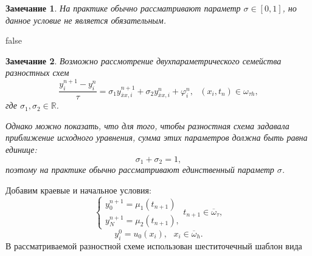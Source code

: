 \documentclass[11pt,a4paper,twoside,listtotoc,bibtotoc]{report}
\numberwithin{equation}{section}
\theoremstyle{definition}
\theoremstyle{plain}
\newtheorem{note}{Замечание}[section]
\begin{document}
%
\begin{note}
%
    На практике обычно рассматривают параметр $\sigma \in [0, 1]$,
    но данное условие не является обязательным.
%
\end{note}
\ifx false
\begin{note}
%
    Возможно рассмотрение двухпараметрического семейства разностных схем
    $$
        \dfrac{y_i^{n+1} - y_i^n}{\tau} = \sigma_1 y_{\overline{x}x,i}^{n+1} +
        \sigma_2 y_{\overline{x}x,i}^n + \varphi_i^n, ~~~(x_i,t_n)\in\omega_{\tau h},
    $$
    где $\sigma_1, \sigma_2 \in\mathbb{R}$.

    Однако можно показать, что для того, чтобы разностная схема задавала приближение
    исходного уравнения,
    сумма этих параметров должна быть равна единице:
    $$
        \sigma_1 + \sigma_2 = 1,
    $$
    поэтому на практике обычно рассматривают единственный параметр $\sigma$.
%
\end{note}
%
\fi
Добавим краевые и начальное условия:
%
\begin{equation}
%
    \label{bord_diskr_5}
    \begin{cases}
        y_0^{n+1} = \mu_1(t_{n+1}) \\
        y_N^{n+1} = \mu_2(t_{n+1}),
    \end{cases}
    t_{n+1}\in \overline{\omega}_{\tau},
%
\end{equation}
%
%
\begin{equation}
%
    \label{start_diskr_5}
    y_i^0 = u_0(x_i),~~~x_i\in \overline{\omega}_h.
%
\end{equation}
%
В рассматриваемой разностной схеме использован шеститочечный шаблон вида
%
\begin{figure}[H]
\centering
{}
\end{figure}
%
\end{document}
